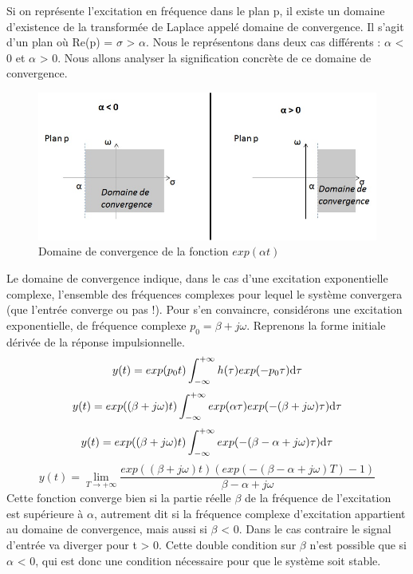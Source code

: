 \documentclass[]{book}
\begin{document}
{	Si on représente l'excitation en fréquence dans le plan p, il existe un
	domaine d'existence de la transformée de Laplace appelé domaine de
	convergence. Il s'agit d'un plan où Re(p) = $\sigma $ \textgreater{} $\alpha $. Nous le
	représentons dans deux cas différents :  $\alpha $ \textless{} 0 et  $\alpha $
	\textgreater{} 0. Nous allons analyser la signification concrète de ce
	domaine de convergence.
	\begin{figure}[h!]
		\centering
		\includegraphics[scale=0.8]{images/Domaine_convergence_exp_at.jpg}
		\caption{Domaine de convergence de la fonction $exp(\alpha t)$}	
		\label{Fig:Domaine_convergence_exp_at} 
	\end{figure}
	Le domaine de convergence indique, dans le cas d'une excitation
	exponentielle complexe, l'ensemble des fréquences complexes pour lequel
	le système convergera (que l'entrée converge ou pas !). Pour s'en
	convaincre, considérons une excitation exponentielle, de fréquence
	complexe $p_{0} =  \beta +j \omega $. Reprenons la forme initiale dérivée de la réponse	impulsionnelle.
	\begin{equation*}
	y(t) = exp(p_{0}t)\int_{-\infty}^{+\infty}h(\tau)exp(-p_{0}\tau) \mathrm{d} \tau 
	\end{equation*}
	\begin{equation*}
	y(t) = exp((\beta+j\omega)t)\int_{-\infty}^{+\infty}exp(\alpha \tau)exp(-(\beta+j\omega)\tau) \mathrm{d} \tau 
	\end{equation*}
	\begin{equation*}
	y(t) = exp((\beta+j\omega)t)\int_{-\infty}^{+\infty}exp(-(\beta-\alpha+j\omega)\tau) \mathrm{d} \tau 
	\end{equation*}
	\begin{equation}
	y(t) = \lim_{T \to +\infty} \frac{exp((\beta+j\omega)t)(exp(-(\beta-\alpha+j\omega)T)-1)}{\beta-\alpha+j\omega} 
	\end{equation}
	Cette fonction converge bien si la partie réelle $\beta $ de la fréquence de
	l'excitation est supérieure à  $\alpha $, autrement dit si la fréquence complexe
	d'excitation appartient au domaine de convergence, mais aussi si $\beta $
	\textless{} 0. Dans le cas contraire le signal d'entrée va diverger pour
	t \textgreater{} 0. Cette double condition sur $\beta $ n'est possible que si $\alpha $
	\textless{} 0, qui est donc une condition nécessaire pour que le système
	soit stable.
	
}
\end{document}
